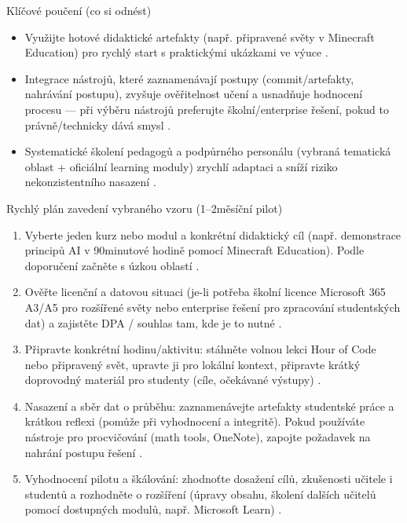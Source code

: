 \documentclass{report}%
\begin{document}
Klíčové poučení (co si odnést)
\begin{itemize}
  \item Využijte hotové didaktické artefakty (např. připravené světy v Minecraft Education) pro rychlý start s praktickými ukázkami ve výuce \cite{kb_ai_101_tipu_pdf_04e4a115_page_15_2}.
  \item Integrace nástrojů, které zaznamenávají postupy (commit/artefakty, nahrávání postupu), zvyšuje ověřitelnost učení a usnadňuje hodnocení procesu — při výběru nástrojů preferujte školní/enterprise řešení, pokud to právně/technicky dává smysl \cite{kb_ai_101_tipu_pdf_04e4a115_page_15_2, kb_ai_101_tipu_pdf_04e4a115_page_8_1}.
  \item Systematické školení pedagogů a podpůrného personálu (vybraná tematická oblast + oficiální learning moduly) zrychlí adaptaci a sníží riziko nekonzistentního nasazení \cite{kb_ai_101_tipu_pdf_04e4a115_page_54_1}.
\end{itemize}

Rychlý plán zavedení vybraného vzoru (1–2měsíční pilot)
\begin{enumerate}
  \item Vyberte jeden kurz nebo modul a konkrétní didaktický cíl (např. demonstrace principů AI v 90minutové hodině pomocí Minecraft Education). Podle doporučení začněte s úzkou oblastí \cite{kb_ai_101_tipu_pdf_04e4a115_page_54_1}.
  \item Ověřte licenční a datovou situaci (je-li potřeba školní licence Microsoft 365 A3/A5 pro rozšířené světy nebo enterprise řešení pro zpracování studentských dat) a zajistěte DPA / souhlas tam, kde je to nutné \cite{kb_ai_101_tipu_pdf_04e4a115_page_15_2}.
  \item Připravte konkrétní hodinu/aktivitu: stáhněte volnou lekci Hour of Code nebo připravený svět, upravte ji pro lokální kontext, připravte krátký doprovodný materiál pro studenty (cíle, očekávané výstupy) \cite{kb_ai_101_tipu_pdf_04e4a115_page_15_2}.
  \item Nasazení a sběr dat o průběhu: zaznamenávejte artefakty studentské práce a krátkou reflexi (pomůže při vyhodnocení a integritě). Pokud používáte nástroje pro procvičování (math tools, OneNote), zapojte požadavek na nahrání postupu řešení \cite{kb_ai_101_tipu_pdf_04e4a115_page_8_1}.
  \item Vyhodnocení pilotu a škálování: zhodnoťte dosažení cílů, zkušenosti učitele i studentů a rozhodněte o rozšíření (úpravy obsahu, školení dalších učitelů pomocí dostupných modulů, např. Microsoft Learn) \cite{kb_ai_101_tipu_pdf_04e4a115_page_54_1}.
\end{enumerate}
\end{document}
